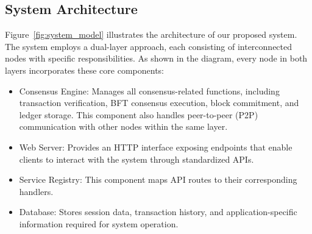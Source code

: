 \documentclass[conference]{IEEEtran}
\begin{document}


\subsection{System Architecture}
Figure~\ref{fig:system_model} illustrates the architecture of our proposed system. The system employs a dual-layer approach, each consisting of interconnected nodes with specific responsibilities. As shown in the diagram, every node in both layers incorporates these core components:

\begin{itemize}
\item Consensus Engine: Manages all consensus-related functions, including transaction verification, BFT consensus execution, block commitment, and ledger storage. This component also handles peer-to-peer (P2P) communication with other nodes within the same layer.
\item Web Server: Provides an HTTP interface exposing endpoints that enable clients to interact with the system through standardized APIs.
\item Service Registry: This component maps API routes to their corresponding handlers.
\item Database: Stores session data, transaction history, and application-specific information required for system operation.
\end{itemize}
\end{document}
